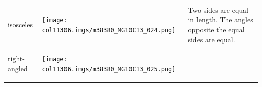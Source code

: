 \begin{table}[H]
\begin{center}
\begin{xtabular*}{\mytablewidth}[t]{|p{10\mystarwidth}|p{10\mystarwidth}|p{10\mystarwidth}|}
    
        isosceles &
    
    
        
                  
    \setcounter{subfigure}{0}

\label{m38380*id317593}
    \begin{center}
    \label{m38380*id317593!!!underscore!!!media}\label{m38380*id317593!!!underscore!!!printimage}\texttt{[image: col11306.imgs/m38380\_MG10C13\_024.png]} %
        
      \vspace{2pt}
    \vspace{.1in}
    
    \end{center}



    \addtocounter{footnote}{-0}
    
                 &
    
    
        Two sides are equal in length. The angles opposite the equal sides are equal.%
     \tabularnewline{}
    
    
        right-angled &
    
    
        
                  
    \setcounter{subfigure}{0}

\label{m38380*id317628}
    \begin{center}
    \label{m38380*id317628!!!underscore!!!media}\label{m38380*id317628!!!underscore!!!printimage}\texttt{[image: col11306.imgs/m38380\_MG10C13\_025.png]} %
        

\end{center}
\end{xtabular*}
\end{center}
\end{table}
